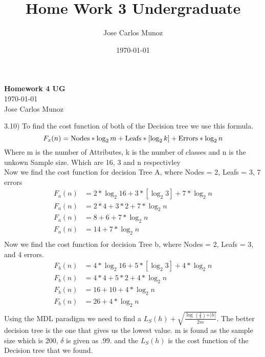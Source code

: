 \documentclass[12pt,english]{article}
\title{Home Work 3 Undergraduate}
\date{\today}
\author{Jose Carlos Munoz}
\begin{document}
\begin{center}
    \Large
    \textbf{Homework 4 UG}\\
    \small
    \today\\
    \large
    Jose Carlos Munoz
\end{center}%
3.10)
To find the cost function of both of the Decision tree we use this formula.
\begin{equation}
F_x(n) = \mbox{Nodes} * \log_{2}m + \mbox{Leafs} * \left [ \log_{2}k \right] + \mbox{Errors} *\log_{2}n \\
\end{equation}
Where m is the number of Attributes, k is the number of classes and n is the unkown Sample size. Which are 16, 3 and n respectivley\\
Now we find the cost function for decision Tree A, where Nodes = 2, Leafs = 3, 7 errors
\begin{equation}\tag{a}\label{eq:a}
\begin{split}
F_a(n) &= 2 * \log_{2}16 + 3 * \left [ \log_{2}3 \right] + 7 *\log_{2} n\\
F_a(n) &= 2 * 4 + 3 * 2 + 7 *\log_{2} n\\
F_a(n) &= 8 + 6 + 7 *\log_{2} n\\
F_a(n) &= 14 + 7 *\log_{2} n\\
\end{split}
\end{equation}
Now we find the cost function for decision Tree b, where Nodes = 2, Leafs = 3, and 4 errors.
\begin{equation}\tag{b}\label{eq:b}
\begin{split}
F_b(n) &= 4 * \log_{2}16 + 5 * \left [ \log_{2}3 \right] + 4 *\log_{2} n\\
F_b(n) &= 4 * 4 + 5 * 2 + 4 *\log_{2} n\\
F_b(n) &= 16 + 10 + 4 *\log_{2} n\\
F_b(n) &= 26 + 4 *\log_{2} n\\
\end{split}
\end{equation}
Using the MDL paradigm we need to find a $L_S(h) + \sqrt{\frac{\log_{ }{\left( \frac{2}{\delta} \right) } + \vert h \vert }{2 m}}$. The better decision tree is the one that gives us the lowest value. m is found as the sample size which is 200, $\delta$ is given as .99. and the $L_S(h)$ is the cost function of the Decision tree that we found.\\
\end{document}
